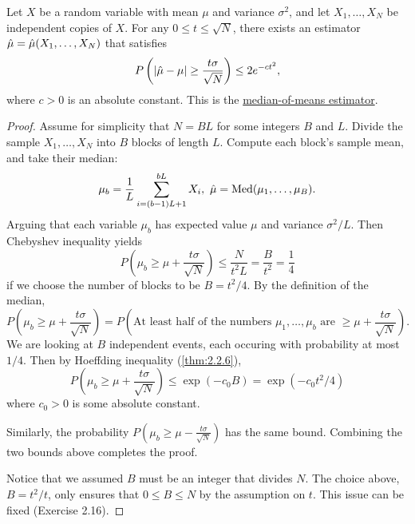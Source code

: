 \begin{theorem}
\label{thm:2.4.1}
Let $X$ be a random variable with mean $\mu$ and variance $\sigma^2$, and let $X_1, \dots, X_N$ be independent 
copies of $X$. For any $0 \leq t \leq \sqrt{N}$, there exists an estimator $\Hat{\mu} 
= \Hat{\mu}(X_1, \dots, X_N)$ that satisfies 
\[ P \left( |\Hat{\mu} - \mu| \geq \frac{t \sigma}{\sqrt{N}} \right) \leq 2e^{-ct^2}, \]
where $c > 0$ is an absolute constant. This is the \underline{median-of-means estimator}.
\end{theorem}

\begin{proof}
Assume for simplicity that $N = BL$ for some integers $B$ and $L$. Divide the sample $X_1, \dots, X_N$ into 
$B$ blocks of length $L$. Compute each block's sample mean, and take their median:
\[ \mu_b = \frac{1}{L}\sum_{i = (b - 1)L + 1}^{bL} X_i, \ \Hat{\mu} = \mathrm{Med}(\mu_1, \dots, \mu_B). \]
Arguing that each variable $\mu_b$ has expected value $\mu$ and variance $\sigma^2 / L$. Then Chebyshev 
inequality yields 
\[ P \left( \mu_b \geq \mu + \frac{t \sigma}{\sqrt{N}} \right) \leq \frac{N}{t^2 L} = \frac{B}{t^2} 
= \frac{1}{4} \]
if we choose the number of blocks to be $B = t^2 / 4$. By the definition of the median, 
\[ P \left( \mu_b \geq \mu + \frac{t \sigma}{\sqrt{N}} \right) 
= P \left( \text{At least half of the numbers } \mu_1, \dots, \mu_b \text{ are } \geq 
\mu + \frac{t \sigma}{\sqrt{N}} \right). \]
We are looking at $B$ independent events, each occuring with probability at most $1/4$. Then by Hoeffding 
inequality (\cref{thm:2.2.6}), 
\[ P \left( \mu_b \geq \mu + \frac{t \sigma}{\sqrt{N}} \right) \leq \exp{(-c_0 B)} = \exp{(-c_0 t^2 / 4)} \]
where $c_0 > 0$ is some absolute constant.

Similarly, the probability $P \left( \mu_b \geq \mu - \frac{t \sigma}{\sqrt{N}} \right)$ has the same 
bound. Combining the two bounds above completes the proof.

Notice that we assumed $B$ must be an integer that divides $N$. The choice above, $B = t^2 / t$, only ensures 
that $0 \leq B \leq N$ by the assumption on $t$. This issue can be fixed (Exercise 2.16).
\end{proof}



